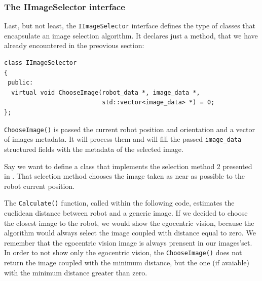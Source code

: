 %
\subsubsection{The IImageSelector interface}
\label{sub:iimageselector}

Last, but not least, the \texttt{IImageSelector} interface
defines the type of classes that encapsulate an image 
selection algorithm. It declares just a method, that 
we have already encountered in the preovious section:
%
\begin{lstlisting}[caption={\texttt{IImageSelector} declaration}, label={code:iimageselector}, frame=trBL]
class IImageSelector
{
 public:
  virtual void ChooseImage(robot_data *, image_data *, 
                           std::vector<image_data> *) = 0;
};
\end{lstlisting}
%
\texttt{ChooseImage()} is passed the current robot position and
orientation and a vector of images metadata. It will process them 
and will fill the passed \texttt{image\_data} structured fields 
with the metadata of the selected image.
%

%
Say we want to define a class that implements the selection 
method 2 presented in \cite{sugimoto}. That selection method
chooses the image taken as near as possible to the robot
current position.
%

%
The \texttt{Calculate()} function, called within the following code,
estimates the euclidean distance between robot and a generic image.
If we decided to choose the closest image to the robot, we would
show the egocentric vision, because the algorithm would always
select the image coupled with distance equal to zero. We remember
that the egocentric vision image is always prensent in our images'set.
%
In order to not show only the egocentric vision, the \texttt{ChooseImage()}
does not return the image coupled with the minimum distance, but the one
(if avaiable) with the minimum distance greater than zero.
%

